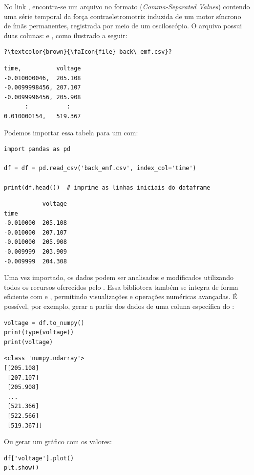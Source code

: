 No link , encontra-se um
arquivo no formato  (\emph{Comma-Separated Values}) contendo uma série temporal da força
contraeletromotriz induzida de um motor síncrono de ímãs permanentes, registrada por meio de um osciloscópio.
O arquivo possui duas colunas:  e , como ilustrado a seguir:
\begin{verbatim}
?\textcolor{brown}{\faIcon{file} back\_emf.csv}?
\end{verbatim}
\vspace{-0.8em}
\begin{verbatim}
time,          voltage
-0.010000046,  205.108
-0.0099998456, 207.107
-0.0099996456, 205.908
      :           :
0.010000154,   519.367
\end{verbatim}

Podemos importar essa tabela para um  com:
\begin{verbatim}
import pandas as pd

df = df = pd.read_csv('back_emf.csv', index_col='time')

print(df.head())  # imprime as linhas iniciais do dataframe
\end{verbatim}
\begin{verbatim}
           voltage
time
-0.010000  205.108
-0.010000  207.107
-0.010000  205.908
-0.009999  203.909
-0.009999  204.308
\end{verbatim}

Uma vez importado, os dados podem ser analisados e modificados utilizando todos os recursos oferecidos
pelo .
Essa biblioteca também se integra de forma eficiente com  e , permitindo
visualizações e operações numéricas avançadas.
É possível, por exemplo, gerar  a partir dos dados de uma coluna específica do :
\begin{verbatim}
voltage = df.to_numpy()
print(type(voltage))
print(voltage)
\end{verbatim}
\begin{verbatim}
<class 'numpy.ndarray'>
[[205.108]
 [207.107]
 [205.908]
 ...
 [521.366]
 [522.566]
 [519.367]]
\end{verbatim}

Ou gerar um gráfico com os valores:
\begin{verbatim}
df['voltage'].plot()
plt.show()
\end{verbatim}

